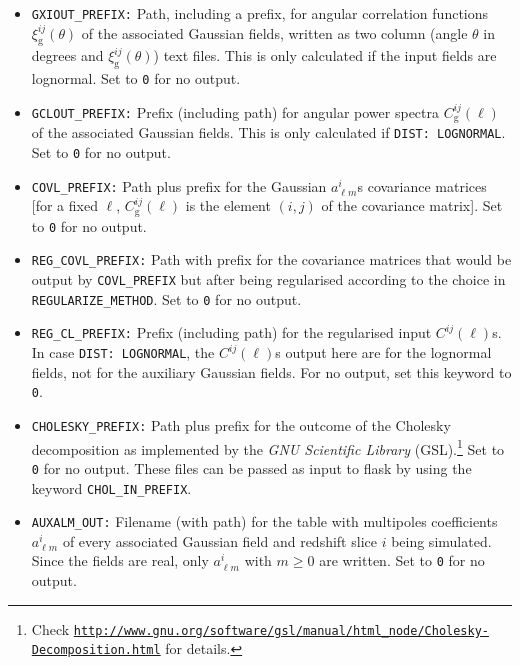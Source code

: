 \documentclass[12pt]{book} %
\newcommand{\nv}[1]{\mathrm{#1}}                 %
\begin{document}
\begin{itemize}
\item {\tt GXIOUT\_PREFIX:} Path, including a prefix, for angular correlation functions 
  $\xi^{ij}_{\nv{g}}(\theta)$ of the associated Gaussian fields, written as two column 
  (angle $\theta$ in degrees and $\xi^{ij}_{\nv{g}}(\theta)$) text files. This is only calculated if the 
  input fields are lognormal. Set to {\tt 0} for no output.

\item {\tt GCLOUT\_PREFIX:} Prefix (including path) for angular power spectra $C_{\nv{g}}^{ij}(\ell)$ 
  of the associated Gaussian fields. This is only calculated if {\tt DIST: LOGNORMAL}. 
  Set to {\tt 0} for no output.

\item {\tt COVL\_PREFIX:} Path plus prefix for the Gaussian $a^{i}_{\ell m}$s covariance matrices 
  [for a fixed $\ell$, $C_{\nv{g}}^{ij}(\ell)$ is the element $(i,j)$ of the covariance matrix]. 
  Set to {\tt 0} for no output.

\item {\tt REG\_COVL\_PREFIX:} Path with prefix for the covariance matrices that would be output 
  by {\tt COVL\_PREFIX} but after being regularised according to the choice in {\tt REGULARIZE\_METHOD}.
  Set to {\tt 0} for no output.

\item {\tt REG\_CL\_PREFIX:} Prefix (including path) for the regularised input $C^{ij}(\ell)$s. 
  In case {\tt DIST: LOGNORMAL}, the $C^{ij}(\ell)$s output here are for the lognormal fields, not for 
  the auxiliary Gaussian fields. For no output, set this keyword to {\tt 0}.

\item {\tt CHOLESKY\_PREFIX:} Path plus prefix for the outcome of the Cholesky decomposition 
  as implemented by the \emph{GNU Scientific Library} 
  (GSL).\footnote{ Check {\tt \href{ http://www.gnu.org/software/gsl/manual/html\_node/Cholesky-Decomposition.html}{http://www.gnu.org/software/gsl/manual/html\_node/Cholesky-Decomposition.html}} for details.} Set to {\tt 0} for no output. 
  These files can be passed as input to {\sc flask} by using the keyword {\tt CHOL\_IN\_PREFIX}.
  
\item {\tt AUXALM\_OUT:} Filename (with path) for the table with multipoles coefficients 
  $a^{i}_{\ell m}$ of every associated Gaussian field and redshift slice $i$ being simulated. 
  Since the fields are real, only $a^{i}_{\ell m}$ with $m\geq 0$ are written.
  Set to {\tt 0} for no output.


\end{itemize}
\end{document}
